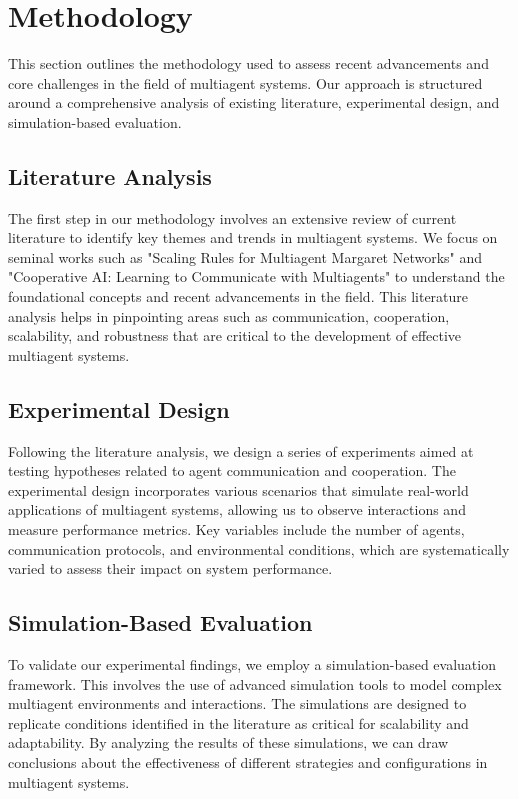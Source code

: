 \section{Methodology}
This section outlines the methodology used to assess recent advancements and core challenges in the field of multiagent systems. Our approach is structured around a comprehensive analysis of existing literature, experimental design, and simulation-based evaluation.

\subsection{Literature Analysis}
The first step in our methodology involves an extensive review of current literature to identify key themes and trends in multiagent systems. We focus on seminal works such as "Scaling Rules for Multiagent Margaret Networks" and "Cooperative AI: Learning to Communicate with Multiagents" to understand the foundational concepts and recent advancements in the field. This literature analysis helps in pinpointing areas such as communication, cooperation, scalability, and robustness that are critical to the development of effective multiagent systems.

\subsection{Experimental Design}
Following the literature analysis, we design a series of experiments aimed at testing hypotheses related to agent communication and cooperation. The experimental design incorporates various scenarios that simulate real-world applications of multiagent systems, allowing us to observe interactions and measure performance metrics. Key variables include the number of agents, communication protocols, and environmental conditions, which are systematically varied to assess their impact on system performance.

\subsection{Simulation-Based Evaluation}
To validate our experimental findings, we employ a simulation-based evaluation framework. This involves the use of advanced simulation tools to model complex multiagent environments and interactions. The simulations are designed to replicate conditions identified in the literature as critical for scalability and adaptability. By analyzing the results of these simulations, we can draw conclusions about the effectiveness of different strategies and configurations in multiagent systems.

